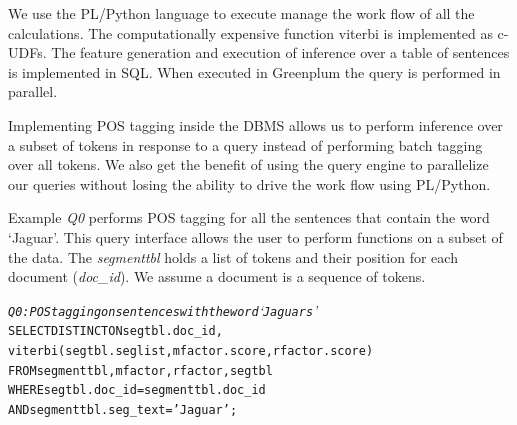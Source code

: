 We use the PL/Python language to execute manage the work flow of all the 
calculations.
The computationally expensive function viterbi is implemented as c-UDFs.
The feature generation and execution of inference 
over a table of sentences is implemented in {SQL}. When executed in Greenplum 
the query is performed in parallel.


Implementing POS tagging inside the DBMS allows us to perform inference over a 
subset of tokens in response to a query instead of performing batch tagging over 
all tokens.
We also get the benefit of using the query engine to parallelize our queries
without losing the ability to drive the work flow using PL/Python.


Example \textit{Q0} performs POS tagging for  all the sentences that contain
the word `Jaguar'. This query interface allows the user to perform
functions on a subset of the data.
The \textit{segmenttbl} holds a list of tokens and their position for each
document (\textit{doc\_id}). We assume a document is a sequence of tokens.


\begin{small}
\begin{alltt}
\textit{Q0: POS tagging on sentences with the word `Jaguars'}
SELECT DISTINCT ON segtbl.doc_id,
    viterbi(segtbl.seglist,mfactor.score,rfactor.score)
FROM segmenttbl, mfactor, rfactor, segtbl
WHERE segtbl.doc_id = segmenttbl.doc_id 
    AND segmenttbl.seg_text='Jaguar';
\end{alltt}
\end{small}













